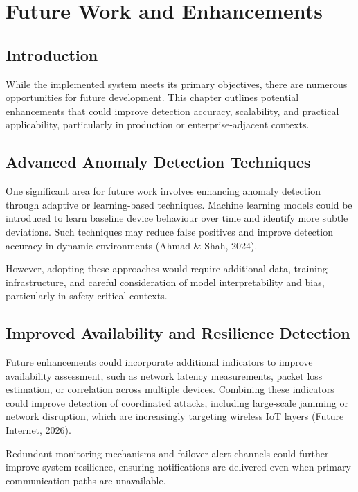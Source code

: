 \chapter{Future Work and Enhancements}
\label{ch:future}

\section{Introduction}

While the implemented system meets its primary objectives, there are numerous opportunities for future development. This chapter outlines potential enhancements that could improve detection accuracy, scalability, and practical applicability, particularly in production or enterprise-adjacent contexts.

\section{Advanced Anomaly Detection Techniques}

One significant area for future work involves enhancing anomaly detection through adaptive or learning-based techniques. Machine learning models could be introduced to learn baseline device behaviour over time and identify more subtle deviations. Such techniques may reduce false positives and improve detection accuracy in dynamic environments (Ahmad \& Shah, 2024).

However, adopting these approaches would require additional data, training infrastructure, and careful consideration of model interpretability and bias, particularly in safety-critical contexts.

\section{Improved Availability and Resilience Detection}

Future enhancements could incorporate additional indicators to improve availability assessment, such as network latency measurements, packet loss estimation, or correlation across multiple devices. Combining these indicators could improve detection of coordinated attacks, including large-scale jamming or network disruption, which are increasingly targeting wireless IoT layers (Future Internet, 2026).

Redundant monitoring mechanisms and failover alert channels could further improve system resilience, ensuring notifications are delivered even when primary communication paths are unavailable.

